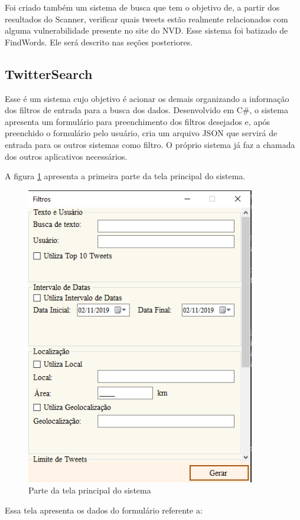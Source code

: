 Foi criado também um sistema de busca que tem o objetivo de, a partir dos resultados do Scanner, verificar quais tweets estão realmente relacionados com alguma vulnerabilidade presente no site do NVD. Esse sistema foi batizado de FindWords. Ele será descrito nas seções posteriores.

\subsection{TwitterSearch}
Esse é um sistema cujo objetivo é acionar os demais organizando a informação dos filtros de entrada para a busca dos dados. Desenvolvido em C\#, o sistema apresenta um formulário para preenchimento dos filtros desejados e,  após preenchido o formulário pelo usuário, cria um arquivo JSON que servirá de entrada para os outros sistemas como filtro. O próprio sistema já faz a chamada dos outros aplicativos necessários.

A figura \ref{fig:TwitterSearch} apresenta a primeira parte da tela principal do sistema.

\begin{figure}[H]
\centering
\includegraphics[width=10cm]{imagens/TwitterSearch.png}
\caption{Parte da tela principal do sistema}
\label{fig:TwitterSearch}
\end{figure}

Essa tela apresenta os dados do formulário referente a:

